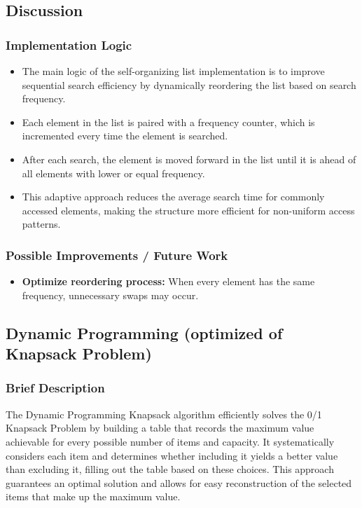 \documentclass{article}
\begin{document}
\subsection*{Discussion}
\subsubsection*{Implementation Logic}
\begin{itemize}
    \item The main logic of the self-organizing list implementation is to improve sequential search efficiency by dynamically reordering the list based on search frequency.
    \item Each element in the list is paired with a frequency counter, which is incremented every time the element is searched.
    \item After each search, the element is moved forward in the list until it is ahead of all elements with lower or equal frequency.
    \item This adaptive approach reduces the average search time for commonly accessed elements, making the structure more efficient for non-uniform access patterns.
\end{itemize}
\subsubsection*{Possible Improvements / Future Work}
\begin{itemize}
    \item \textbf{Optimize reordering process:} When every element has the same frequency, unnecessary swaps may occur.
\end{itemize}


\subsection{Dynamic Programming (optimized of Knapsack Problem)}
\subsubsection*{Brief Description}
The Dynamic Programming Knapsack algorithm efficiently solves the 0/1 Knapsack Problem by building a table that records the maximum value achievable for every possible number of items and capacity. It systematically considers each item and determines whether including it yields a better value than excluding it, filling out the table based on these choices. This approach guarantees an optimal solution and allows for easy reconstruction of the selected items that make up the maximum value.
\end{document}
